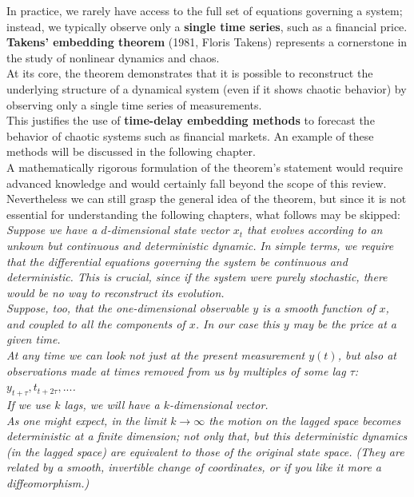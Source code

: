 In practice, we rarely have access to the full set of equations governing a system; instead, we typically observe only a \textbf{single time series}, such as a financial price.\\

\textbf{Takens' embedding theorem} (1981, Floris Takens) represents a cornerstone in the study of nonlinear dynamics and chaos.\\

At its core, the theorem demonstrates that it is possible to reconstruct the underlying structure of a dynamical system (even if it shows chaotic behavior) by observing only a single time series of measurements.\\

This justifies the use of \textbf{time-delay embedding methods} to forecast the behavior of chaotic systems such as financial markets. An example of these methods will be discussed in the following chapter.\\

A mathematically rigorous formulation of the theorem's statement would require advanced knowledge and would certainly fall beyond the scope of this review.\\

Nevertheless we can still grasp the general idea of the theorem, but since it is not essential for understanding the following chapters, what follows may be skipped:\\

\textit{Suppose we have a $d$-dimensional state vector $x_t$ that evolves according to an unkown but continuous and deterministic dynamic.} \textit{In simple terms, we require that the differential equations governing the system be continuous and deterministic. This is crucial, since if the system were purely stochastic, there would be no way to reconstruct its evolution.}\\
\textit{Suppose, too, that the one-dimensional observable $y$ is a smooth function of $x$, and coupled to all the components of $x$. In our case this $y$ may be the price at a given time.}\\

\textit{At any time we can look not just at the present measurement $y(t)$, but also at observations made at times removed from us by multiples of some lag $\tau$: $y_{t+\tau},t_{t+2\tau},...$.\\}
\textit{If we use $k$ lags, we will have a $k$-dimensional vector.\\}
\textit{As one might expect, in the limit $k \to \infty$ the motion on the lagged space becomes deterministic at a finite dimension; not only that, but this deterministic dynamics (in the lagged space) are equivalent to those of the original state space. (They are related by a smooth, invertible change of coordinates, or if you like it more a diffeomorphism.)}




